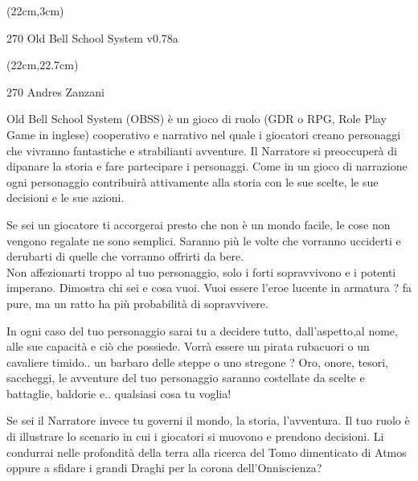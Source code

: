 \documentclass[10pt,a4paper]{article}
\def \versione {0.78a}
\begin{document}
\begin{textblock*}{2cm}(22cm,3cm) %
\begin{turn}{270}
	{\Huge Old Bell School System v\versione}\\
\end{turn}
\end{textblock*}


\begin{textblock*}{2cm}(22cm,22.7cm) %
\begin{turn}{270}
	{\Huge Andres Zanzani}
\end{turn}
\end{textblock*}



Old Bell School System (OBSS) è un gioco di ruolo (GDR o RPG, Role Play Game in inglese) cooperativo e narrativo nel quale i giocatori creano personaggi che vivranno fantastiche e strabilianti avventure. Il Narratore si preoccuperà di dipanare la storia e fare partecipare i personaggi. Come in un gioco di narrazione ogni personaggio contribuirà attivamente alla storia con le sue scelte, le sue decisioni e le sue azioni.

Se sei un giocatore ti accorgerai presto che non è un mondo facile, le cose non vengono regalate ne sono semplici. Saranno più le volte che vorranno ucciderti e derubarti di quelle che vorranno offrirti da bere.\\
Non affezionarti troppo al tuo personaggio, solo i forti sopravvivono e i potenti imperano. Dimostra chi sei e cosa vuoi. Vuoi essere l'eroe lucente in armatura ? fa pure, ma un ratto ha più probabilità di sopravvivere.

In ogni caso del tuo personaggio sarai tu a decidere tutto, dall'aspetto,al nome, alle sue capacità e ciò che possiede. Vorrà essere un pirata rubacuori o un cavaliere timido.. un barbaro delle steppe o uno stregone ? Oro, onore, tesori, saccheggi, le avventure del tuo personaggio saranno costellate da scelte e battaglie, baldorie e.. qualsiasi cosa tu voglia!

Se sei il Narratore invece tu governi il mondo,  la storia, l'avventura. Il tuo ruolo è di illustrare lo scenario in cui i giocatori si muovono e prendono decisioni. Li condurrai nelle profondità della terra alla ricerca del Tomo dimenticato di Atmos oppure a sfidare i grandi Draghi per la corona dell'Onniscienza?
\end{document}
